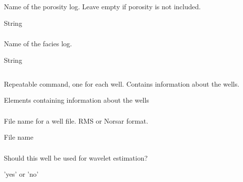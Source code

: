 \subsubsection{}
 \slist
   \item \Description Name of the porosity log. Leave empty if porosity is not included.
   \item \Argument String
   \item \Default
 \elist

\subsubsection{}
 \slist
   \item \Description Name of the facies log.
   \item \Argument String
   \item \Default %
 \elist

\subsection{}
 \slist
   \item \Description Repeatable command, one for each well. Contains information about the wells.
   \item \Argument Elements containing information about the wells
   \item \Default
 \elist

\subsubsection{}
 \slist
   \item \Description File name for a well file. RMS or Norsar format.
   \item \Argument File name
   \item \Default
 \elist


\subsubsection{}
 \slist
   \item \Description Should this well be used for wavelet estimation?
   \item \Argument 'yes' or 'no'
   \item \Default
 \elist


